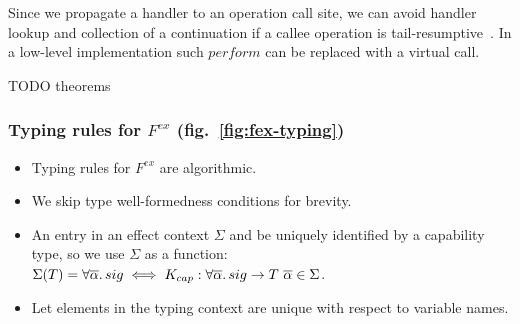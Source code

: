 \documentclass[acmsmall]{acmart}
\newcommand{\ap}{~}
\begin{document}
Since we propagate a handler to an operation call site, we can avoid handler lookup and collection of a continuation if a callee operation is tail-resumptive~\cite{xie2020effect}.
In a low-level implementation such $perform$ can be replaced with a virtual call. %

TODO theorems %

\subsubsection{Typing rules for $F^{ex}$ (fig.\ \ref{fig:fex-typing})}

\begin{itemize}
    \item Typing rules for $F^{ex}$ are algorithmic.
    \item We skip type well-formedness conditions for brevity.
    \item An entry in an effect context $\Sigma$ and be uniquely identified by a capability type, so we use $\Sigma$ as a function: $\Sigma(T) = \forall\overline{\alpha}\ldotp sig \iff K_{cap} : \forall\overline{\alpha}\ldotp sig\to T\ap\overline{\alpha}\in\Sigma$.
    \item Let elements in the typing context are unique with respect to variable names.
\end{itemize}
\end{document}
